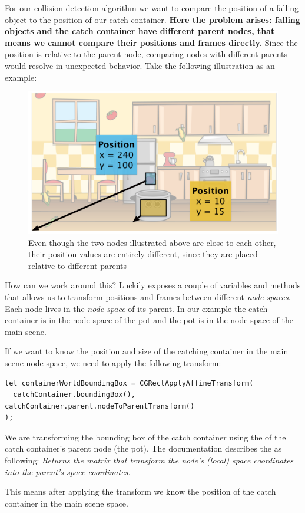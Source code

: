 For our collision detection algorithm we want to compare the position of a
falling object to the position of our catch container. \textbf{Here the problem
arises: falling objects and the catch container have different parent nodes,
that means we cannot compare their positions and frames directly.} Since the
position is relative to the parent node, comparing nodes with different parents
would resolve in unexpected behavior. Take the following illustration as an
example:
\begin{figure}[H]
		\centering
		\includegraphics[width=0.7\linewidth]{images/Chapter3/parent_transform.png}
		\caption{Even though the two nodes illustrated above are close to each other,
		their position values are entirely different, since they are placed relative
		to different parents}
\end{figure}
How can we work around this? Luckily \cocos{} exposes a couple of variables and
methods that allows us to transform positions and frames between different
\textit{node spaces}. Each node lives in the \textit{node space} of its parent.
In our example the catch container is in the node space of the pot and the pot is
in the node space of the main scene.

If we want to know the position and size of the catching container in the main
scene node space, we need to apply the following transform:
\begin{lstlisting}
let containerWorldBoundingBox = CGRectApplyAffineTransform(
  catchContainer.boundingBox(), catchContainer.parent.nodeToParentTransform()
);
\end{lstlisting}
We are transforming the bounding box of the catch container using the
 of the catch container's parent node (the
pot). The \cocos{} documentation describes the
 as following: \textit{Returns the matrix that
transform the node's (local) space coordinates into the parent's space coordinates.}

This means after applying the transform we know the position of the catch
container in the main scene space. 


